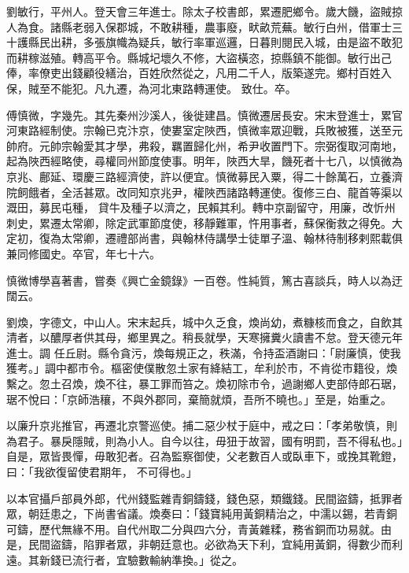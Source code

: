 \begin{pinyinscope}
 劉敏行，平州人。登天會三年進士。除太子校書郎，累遷肥鄉令。歲大饑，盜賊掠人為食。諸縣老弱入保郡城，不敢耕種，農事廢，畎畝荒蕪。敏行白州，借軍士三十護縣民出耕，多張旗幟為疑兵，敏行率軍巡邏，日暮則閱民入城，由是盜不敢犯而耕稼滋殖。轉高平令。縣城圮壞久不修，大盜橫恣，掠縣鎮不能御。敏行出己俸，率僚吏出錢顧役繕治，百姓欣然從之，凡用二千人，版築遂完。鄉村百姓入保，賊至不能犯。凡九遷，為河北東路轉運使。
 致仕。卒。



 傅慎微，字幾先。其先秦州沙溪人，後徙建昌。慎微遷居長安。宋末登進士，累官河東路經制使。宗翰已克汴京，使婁室定陜西，慎微率眾迎戰，兵敗被獲，送至元帥府。元帥宗翰愛其才學，弗殺，羈置歸化州，希尹收置門下。宗弼復取河南地，起為陜西經略使，尋權同州節度使事。明年，陜西大旱，饑死者十七八，以慎微為京兆、鄜延、環慶三路經濟使，許以便宜。慎微募民入粟，得二十餘萬石，立養濟院飼餓者，全活甚眾。改同知京兆尹，權陜西諸路轉運使。復修三白、龍首等渠以溉田，募民屯種，
 貸牛及種子以濟之，民賴其利。轉中京副留守，用廉，改忻州刺史，累遷太常卿，除定武軍節度使，移靜難軍，忤用事者，蘇保衡救之得免。大定初，復為太常卿，遷禮部尚書，與翰林侍講學士徒單子溫、翰林待制移剌熙載俱兼同修國史。卒官，年七十六。



 慎微博學喜著書，嘗奏《興亡金鏡錄》一百卷。性純質，篤古喜談兵，時人以為迂闊云。



 劉煥，字德文，中山人。宋末起兵，城中久乏食，煥尚幼，煮糠核而食之，自飲其清者，以醲厚者供其母，鄉里異之。稍長就學，天寒擁糞火讀書不怠。登天德元年進士。調
 任丘尉。縣令貪污，煥每規正之，秩滿，令持盃酒謝曰：「尉廉慎，使我獲考。」調中都市令。樞密使僕散忽土家有絳結工，牟利於市，不肯從市籍役，煥繫之。忽土召煥，煥不往，暴工罪而笞之。煥初除市令，過謝鄉人吏部侍郎石琚，琚不悅曰：「京師浩穰，不與外郡同，棄簡就煩，吾所不曉也。」至是，始重之。



 以廉升京兆推官，再遷北京警巡使。捕二惡少杖于庭中，戒之曰：「孝弟敬慎，則為君子。暴戾隱賊，則為小人。自今以往，毋狃于故習，國有明罰，吾不得私也。」自是，眾皆畏憚，毋敢犯者。召為監察御使，父老數百人或臥車下，或挽其靴鐙，曰：「我欲復留使君期年，
 不可得也。」



 以本官攝戶部員外郎，代州錢監雜青銅鑄錢，錢色惡，類鐵錢。民間盜鑄，抵罪者眾，朝廷患之，下尚書省議。煥奏曰：「錢寶純用黃銅精治之，中濡以錫，若青銅可鑄，歷代無緣不用。自代州取二分與四六分，青黃雜糅，務省銅而功易就。由是，民間盜鑄，陷罪者眾，非朝廷意也。必欲為天下利，宜純用黃銅，得數少而利遠。其新錢已流行者，宜驗數輸納準換。」從之。




\end{pinyinscope}
